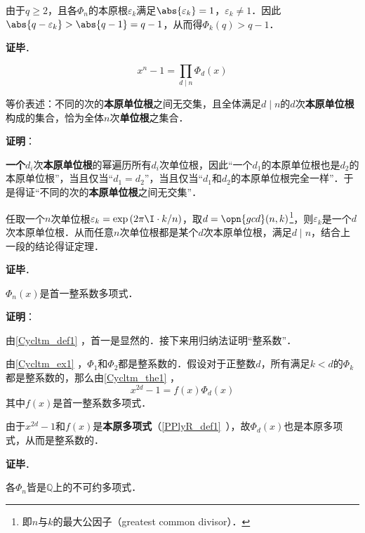 由于$q\geq 2$，且各$\Phi_n$的本原根$\varepsilon_k$满足$\abs{\varepsilon_k}=1$，$\varepsilon_k\neq 1$．因此$\abs{q-\varepsilon_k}>\abs{q-1}=q-1$，从而得$\Phi_k(q)>q-1$．


\textbf{证毕}．




\begin{theorem}{}\label{Cycltm_the1}
\begin{equation}
x^n-1 = \prod_{d\mid n}\Phi_d(x)
\end{equation}

等价表述：不同的次的\textbf{本原单位根}之间无交集，且全体满足$d\mid n$的$d$次\textbf{本原单位根}构成的集合，恰为全体$n$次\textbf{单位根}之集合．
\end{theorem}

\textbf{证明}：

\textbf{一个}$d_i$次\textbf{本原单位根}的幂遍历所有$d_i$次单位根，因此“一个$d_1$的本原单位根也是$d_2$的本原单位根”，当且仅当“$d_1=d_2$”，当且仅当“$d_1$和$d_2$的本原单位根完全一样”．于是得证“不同的次的\textbf{本原单位根}之间无交集”．

任取一个$n$次单位根$\varepsilon_k=\exp{(2\pi\I\cdot  k/n)}$，取$d=\opn{gcd}(n, k)$\footnote{即$n$与$k$的最大公因子（greatest common divisor）．}，则$\varepsilon_k$是一个$d$次本原单位根．从而任意$n$次单位根都是某个$d$次本原单位根，满足$d\mid n$，结合上一段的结论得证定理．

\textbf{证毕}．



\begin{theorem}{}\label{Cycltm_the2}
$\Phi_n(x)$是首一整系数多项式．
\end{theorem}

\textbf{证明}：

由\autoref{Cycltm_def1} ，首一是显然的．接下来用归纳法证明“整系数”．

由\autoref{Cycltm_ex1} ，$\Phi_1$和$\Phi_2$都是整系数的．假设对于正整数$d$，所有满足$k<d$的$\Phi_k$都是整系数的，那么由\autoref{Cycltm_the1} ，
\begin{equation}
x^{2d}-1 = f(x)\Phi_d(x)
\end{equation}
其中$f(x)$是首一整系数多项式．

由于$x^{2d}-1$和$f(x)$是\textbf{本原多项式}（\autoref{PPlyR_def1}~），故$\Phi_d(x)$也是本原多项式，从而是整系数的．

\textbf{证毕}．




\begin{theorem}{}
各$\Phi_n$皆是$\mathbb{Q}$上的不可约多项式．
\end{theorem}

